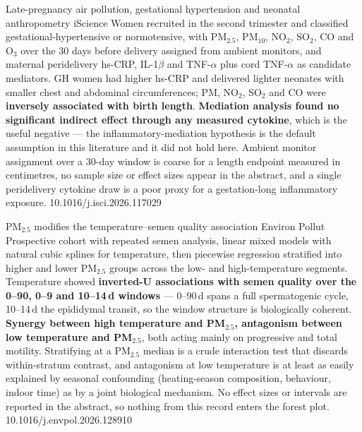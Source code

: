 \documentclass[10pt]{article}
\begin{document}
{Late-pregnancy air pollution, gestational hypertension and neonatal anthropometry}
{iScience}
{Women recruited in the second trimester and classified gestational-hypertensive or
normotensive, with PM$_{2.5}$, PM$_{10}$, NO$_2$, SO$_2$, CO and O$_3$ over the 30 days
before delivery assigned from ambient monitors, and maternal peridelivery hs-CRP, IL-1$\beta$
and TNF-$\alpha$ plus cord TNF-$\alpha$ as candidate mediators. GH women had higher hs-CRP
and delivered lighter neonates with smaller chest and abdominal circumferences; PM,
NO$_2$, SO$_2$ and CO were \textbf{inversely associated with birth length}. \textbf{Mediation
analysis found no significant indirect effect through any measured cytokine}, which is the
useful negative --- the inflammatory-mediation hypothesis is the default assumption in this
literature and it did not hold here. Ambient monitor assignment over a 30-day window is
coarse for a length endpoint measured in centimetres, no sample size or effect sizes appear
in the abstract, and a single peridelivery cytokine draw is a poor proxy for a
gestation-long inflammatory exposure.}
{10.1016/j.isci.2026.117029}

{PM$_{2.5}$ modifies the temperature--semen quality association}
{Environ Pollut}
{Prospective cohort with repeated semen analysis, linear mixed models with natural cubic
splines for temperature, then piecewise regression stratified into higher and lower
PM$_{2.5}$ groups across the low- and high-temperature segments. Temperature showed
\textbf{inverted-U associations with semen quality over the 0--90, 0--9 and 10--14\,d
windows} --- 0--90\,d spans a full spermatogenic cycle, 10--14\,d the epididymal transit,
so the window structure is biologically coherent. \textbf{Synergy between high temperature
and PM$_{2.5}$, antagonism between low temperature and PM$_{2.5}$}, both acting mainly on
progressive and total motility. Stratifying at a PM$_{2.5}$ median is a crude interaction
test that discards within-stratum contrast, and antagonism at low temperature is at least as
easily explained by seasonal confounding (heating-season composition, behaviour, indoor
time) as by a joint biological mechanism. No effect sizes or intervals are reported in the
abstract, so nothing from this record enters the forest plot.}
{10.1016/j.envpol.2026.128910}

\end{document}
